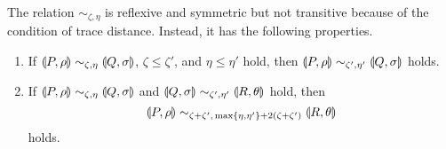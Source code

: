 The relation $\sim_{\zeta, \eta}$ is reflexive and symmetric but
not transitive because of the condition of trace distance. Instead,
it has the following properties.
\begin{prop}
\label{par:transitivitylike}
 \begin{enumerate}
  \item If $\llparenthesis P, \rho \rrparenthesis \sim_{\zeta, \eta} \llparenthesis Q, \sigma \rrparenthesis$,
	$\zeta \le \zeta'$, and $\eta \le \eta'$ hold, 
	then $\llparenthesis P, \rho \rrparenthesis \sim_{\zeta', \eta'} \llparenthesis Q, \sigma \rrparenthesis$ holds.
  \item If $\llparenthesis P, \rho \rrparenthesis \sim_{\zeta, \eta} \llparenthesis Q, \sigma \rrparenthesis$ and
	$\llparenthesis Q, \sigma \rrparenthesis \sim_{\zeta', \eta'} \llparenthesis R, \theta \rrparenthesis$ hold,
	then
	\[
	 \llparenthesis P, \rho \rrparenthesis \sim_{\zeta + \zeta',\,\mathrm{max}\{\eta,
	\eta'\} + 2(\zeta + \zeta')} \llparenthesis R, \theta \rrparenthesis
	\] 
	holds.
 \end{enumerate}
\end{prop}
